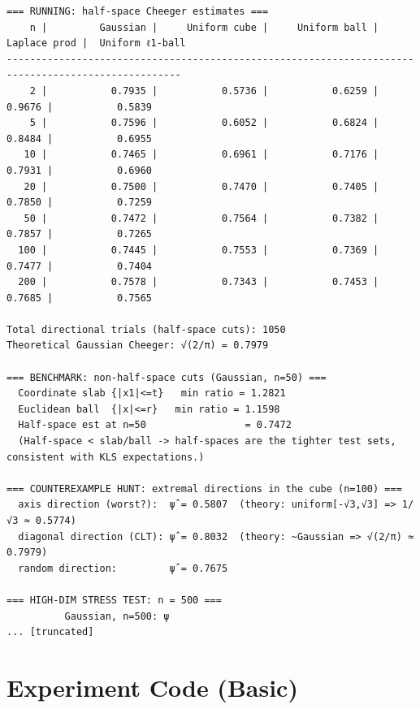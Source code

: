 \documentclass[11pt]{article}
\begin{document}
\begin{lstlisting}
=== RUNNING: half-space Cheeger estimates ===
    n |         Gaussian |     Uniform cube |     Uniform ball |     Laplace prod |  Uniform ℓ1-ball
----------------------------------------------------------------------------------------------------
    2 |           0.7935 |           0.5736 |           0.6259 |           0.9676 |           0.5839
    5 |           0.7596 |           0.6052 |           0.6824 |           0.8484 |           0.6955
   10 |           0.7465 |           0.6961 |           0.7176 |           0.7931 |           0.6960
   20 |           0.7500 |           0.7470 |           0.7405 |           0.7850 |           0.7259
   50 |           0.7472 |           0.7564 |           0.7382 |           0.7857 |           0.7265
  100 |           0.7445 |           0.7553 |           0.7369 |           0.7477 |           0.7404
  200 |           0.7578 |           0.7343 |           0.7453 |           0.7685 |           0.7565

Total directional trials (half-space cuts): 1050
Theoretical Gaussian Cheeger: √(2/π) = 0.7979

=== BENCHMARK: non-half-space cuts (Gaussian, n=50) ===
  Coordinate slab {|x1|<=t}   min ratio = 1.2821
  Euclidean ball  {|x|<=r}   min ratio = 1.1598
  Half-space est at n=50                 = 0.7472
  (Half-space < slab/ball -> half-spaces are the tighter test sets, consistent with KLS expectations.)

=== COUNTEREXAMPLE HUNT: extremal directions in the cube (n=100) ===
  axis direction (worst?):  ψ̂ = 0.5807  (theory: uniform[-√3,√3] => 1/√3 ≈ 0.5774)
  diagonal direction (CLT): ψ̂ = 0.8032  (theory: ~Gaussian => √(2/π) ≈ 0.7979)
  random direction:         ψ̂ = 0.7675

=== HIGH-DIM STRESS TEST: n = 500 ===
          Gaussian, n=500: ψ
... [truncated]
\end{lstlisting}


\section{Experiment Code (Basic)}
\end{document}
